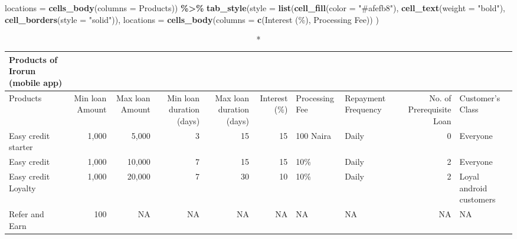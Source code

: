 \documentclass[
]{article}
\newenvironment{Shaded}{\begin{snugshade}}{\end{snugshade}}
\newcommand{\AttributeTok}[1]{\textcolor[rgb]{0.13,0.29,0.53}{#1}}
\newcommand{\FunctionTok}[1]{\textcolor[rgb]{0.13,0.29,0.53}{\textbf{#1}}}
\newcommand{\NormalTok}[1]{#1}
\newcommand{\SpecialCharTok}[1]{\textcolor[rgb]{0.81,0.36,0.00}{\textbf{#1}}}
\newcommand{\StringTok}[1]{\textcolor[rgb]{0.31,0.60,0.02}{#1}}
\begin{document}
\begin{Shaded}
\begin{Highlighting}[]
            \AttributeTok{locations =} \FunctionTok{cells\_body}\NormalTok{(}\AttributeTok{columns =}\NormalTok{ Products)) }\SpecialCharTok{\%\textgreater{}\%} 
  \FunctionTok{tab\_style}\NormalTok{(}\AttributeTok{style =} \FunctionTok{list}\NormalTok{(}\FunctionTok{cell\_fill}\NormalTok{(}\AttributeTok{color =} \StringTok{"\#afefb8"}\NormalTok{),}
                         \FunctionTok{cell\_text}\NormalTok{(}\AttributeTok{weight =} \StringTok{"bold"}\NormalTok{), }\FunctionTok{cell\_borders}\NormalTok{(}\AttributeTok{style =} \StringTok{"solid"}\NormalTok{)),}
            \AttributeTok{locations =} \FunctionTok{cells\_body}\NormalTok{(}\AttributeTok{columns =} \FunctionTok{c}\NormalTok{(}\StringTok{\textasciigrave{}}\AttributeTok{Interest (\%)}\StringTok{\textasciigrave{}}\NormalTok{, }\StringTok{\textasciigrave{}}\AttributeTok{Processing Fee}\StringTok{\textasciigrave{}}\NormalTok{))}
\NormalTok{            )}
\end{Highlighting}
\end{Shaded}

\begin{longtable}{lrrrrrllrl}
\caption*{
{\large Products of Irorun (mobile app)}
} \\ 
\toprule
Products & Min loan Amount & Max loan Amount & Min loan duration (days) & Max loan duration (days) & Interest (\%) & Processing Fee & Repayment Frequency & No. of Prerequisite Loan & Customer's Class \\ 
\midrule
Easy credit starter & 1,000 & 5,000 & 3 & 15 & 15 & 100 Naira & Daily & 0 & Everyone \\ 
Easy credit & 1,000 & 10,000 & 7 & 15 & 15 & 10\% & Daily & 2 & Everyone \\ 
Easy credit Loyalty & 1,000 & 20,000 & 7 & 30 & 10 & 10\% & Daily & 2 & Loyal android customers \\ 
Refer and Earn & 100 & NA & NA & NA & NA & NA & NA & NA & NA \\ 
\bottomrule
\end{longtable}
\end{document}
